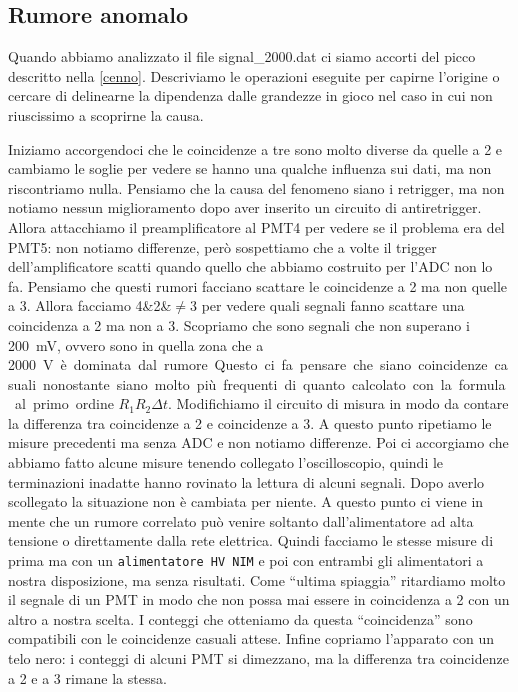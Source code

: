 \subsection{Rumore anomalo}
\label{rumore}

Quando abbiamo analizzato il file signal\_2000.dat ci siamo accorti del picco descritto nella \autoref{cenno}. Descriviamo le operazioni eseguite per capirne l'origine o cercare di delinearne la dipendenza dalle grandezze in gioco nel caso in cui non riuscissimo a scoprirne la causa.

Iniziamo accorgendoci che le coincidenze a tre sono molto diverse da quelle a 2 e cambiamo le soglie per vedere se hanno una qualche influenza sui dati, ma non riscontriamo nulla. Pensiamo che la causa del fenomeno siano i retrigger, ma non notiamo nessun miglioramento dopo aver inserito un circuito di antiretrigger. Allora attacchiamo il preamplificatore al PMT4 per vedere se il problema era del PMT5: non notiamo differenze, però sospettiamo che a volte il trigger dell'amplificatore scatti quando quello che abbiamo costruito per l'ADC non lo fa.
Pensiamo che questi rumori facciano scattare le coincidenze a 2 ma non quelle a 3. Allora facciamo 4\&2\&$\neq$3 per vedere quali segnali fanno scattare una coincidenza a 2 ma non a 3. Scopriamo che sono segnali che non superano i \SI{200}{mV}, ovvero sono in quella zona che a \SI{2000}V è dominata dal rumore. Questo ci fa pensare che siano coincidenze casuali nonostante siano molto più frequenti di quanto calcolato con la formula al primo ordine $R_1 R_2 \Delta t$. 
Modifichiamo il circuito di misura in modo da contare la differenza tra coincidenze a 2 e coincidenze a 3.
A questo punto ripetiamo le misure precedenti ma senza ADC e non notiamo differenze.
Poi ci accorgiamo che abbiamo fatto alcune misure tenendo collegato l'oscilloscopio, quindi le terminazioni inadatte hanno rovinato la lettura di alcuni segnali. Dopo averlo scollegato la situazione non è cambiata per niente. A questo punto ci viene in mente che un rumore correlato può venire soltanto dall'alimentatore ad alta tensione o direttamente dalla rete elettrica. Quindi facciamo le stesse misure di prima ma con un  \texttt{alimentatore HV NIM} e poi con entrambi gli alimentatori a nostra disposizione, ma senza risultati. Come ``ultima spiaggia'' ritardiamo molto il segnale di un PMT in modo che non possa mai essere in coincidenza a 2 con un altro a nostra scelta. I conteggi che otteniamo da questa ``coincidenza'' sono compatibili con le coincidenze casuali attese. 
Infine copriamo l'apparato con un telo nero: i conteggi di alcuni PMT si dimezzano, ma la differenza tra coincidenze a 2 e a 3 rimane la stessa.

